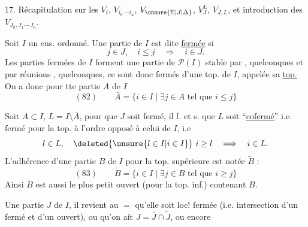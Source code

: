 
17. Récapitulation sur les $V_i$, $V_{i_0\mathord{\cdot}\mathord{-}i_n}$, $V_{\unsure{\Sigma|J|\Delta}}$, $V_J^L$, $V_{J,L}$, et introduction des $V_{J_0,J_1\mathord{\cdot}\mathord{-}J_n}$.

Soit $I$ un ens. ordonné. Une partie  de $I$ est dite \uline{fermée} si
\[j\in J,\quad i\leq j\quad\Longrightarrow\quad i\in J.\]
Les parties fermées de $I$ forment une  partie de $\mathcal P(I)$ stable par , quelconques et par réunions , quelconques, ce sont donc   fermés d'une top. de $I$, appelée sa \uline{top.}   On a donc pour tte partie $A$ de $I$
\[
(82)\qquad\bar A=\{i\in I\mid\exists j\in A\text{ tel que }i\leq j\}
\]

 Soit $A\subset I$, $L=I\setminus\bar A$, pour que $J$ soit fermé,  il f. et s. que $L$ soit ``\uline{cofermé}'' i.e. fermé pour la top.  à l'ordre opposé à  celui de $I$, i.e
\[l\in L,\quad\deleted{\unsure{l\in I|i\in I}}\ i\geq l\quad\Longrightarrow\quad i\in L.\]
L'adhérence d'une partie $B$ de $I$ pour la top. supérieure est notée $\widetilde B$ :
\[
(83)\qquad\widetilde B=\{i\in I\mid\exists j\in B\text{ tel que }i\geq j\}
\]
 Ainsi $\widetilde B$ est aussi le plus petit ouvert (pour la top. inf.) contenant $B$.

 Une partie $J$ de $I$, il revient au $=$ qu'elle soit loc! fermée (i.e. intersection d'un fermé et d'un ouvert), ou qu'on ait $J=\bar J\cap\widetilde J$, ou encore
